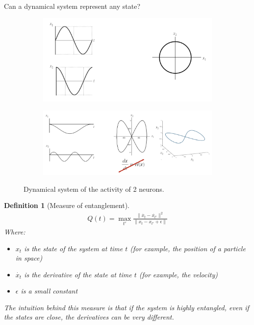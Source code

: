 \documentclass[11pt]{book} %
\newtheorem{definition}{Definition}[section]
\begin{document}
Can a dynamical system represent any state?

\begin{figure}[h]
    \begin{subfigure}[b]{0.3\textwidth}
        \centering
        \includegraphics[width=\textwidth]{./Figs/circle_dynamical_system.jpeg}
        \label{fig:dynamical_system}
    \end{subfigure}
    \begin{subfigure}[b]{0.67\textwidth}
        \centering
        \includegraphics[width=\textwidth]{./Figs/dynamics_2_neurons.jpeg}
        \label{fig:dynamical_system_2_neurons}
    \end{subfigure}
    \caption{Dynamical system of the activity of 2 neurons.}
    \label{fig:dynamical_system}
\end{figure}

\begin{definition}[Measure of entanglement]
    \begin{align}
        Q(t) = \max_{t'} \frac{ \lVert \dot{x_t} - \dot{x_{t'}} \rVert^2 }{ \lVert x_t - x_{t'} + \epsilon \rVert }
    \end{align}
    Where:
    \begin{itemize}
        \item \( x_t \) is the state of the system at time \( t \) (for example, the position of a particle in space)
        \item \( \dot{x_t} \) is the derivative of the state at time \( t \) (for example, the velocity)
        \item \( \epsilon \) is a small constant
    \end{itemize}
    The intuition behind this measure is that if the system is highly entangled, even if the states are close, the derivatives can be very different.
\end{definition}
\end{document}
